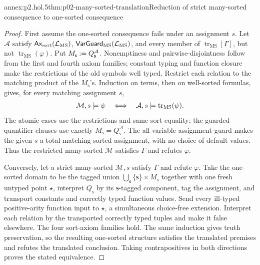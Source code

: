 \begin{annexitem}{annex:p2.hol.5}{thm:p02-many-sorted-translation}{Reduction of strict many-sorted consequence to one-sorted consequence}
\begin{proof}
First assume the one-sorted consequence fails under an assignment \(s\).  Let
\(\mathcal A\) satisfy \(\mathsf{Ax}_{\mathrm{sort}}(\mathcal{L}_{\mathrm{MS}})\),
\(\mathsf{VarGuard}_{\mathrm{MS}}(\mathcal{L}_{\mathrm{MS}})\), and every member of
\(\operatorname{tr}_{\mathrm{MS}}[\Gamma]\), but not
\(\operatorname{tr}_{\mathrm{MS}}(\varphi)\).  Put
\(M_{\mathsf s}\mathrel{:=} Q_{\mathsf s}^{\mathcal A}\).  Nonemptiness and pairwise-disjointness
follow from the first and fourth axiom families; constant typing and function
closure make the restrictions of the old symbols well typed.  Restrict each
relation to the matching product of the \(M_{\mathsf s}\)'s.  Induction on terms, then
on well-sorted formulas, gives, for every matching assignment \(s\),
\[
 \mathcal M,s\models\psi
 \quad\Longleftrightarrow\quad
 \mathcal A,s\models\operatorname{tr}_{\mathrm{MS}}(\psi).
\]
The atomic cases use the restrictions and same-sort equality; the guarded
quantifier clauses use exactly
\(M_{\mathsf s}=Q_{\mathsf s}^{\mathcal A}\).  The all-variable assignment
guard makes the given \(s\) a total matching sorted assignment, with no choice
of default values.  Thus the restricted many-sorted \(\mathcal M\) satisfies
\(\Gamma\) and refutes \(\varphi\).

Conversely, let a strict many-sorted \(\mathcal M,s\) satisfy \(\Gamma\) and
refute \(\varphi\).  Take the one-sorted domain to be the tagged union
\(\bigcup_{\mathsf s}\{\mathsf s\}\times M_{\mathsf s}\) together with one
fresh untyped point \(\star\), interpret
\(Q_{\mathsf s}\) by its \(\mathsf s\)-tagged
component, tag the assignment, and transport constants and correctly typed
function values.  Send every ill-typed positive-arity function input to
\(\star\), a simultaneous choice-free extension.
Interpret each relation by the transported correctly typed tuples and make it
false elsewhere.  The four sort-axiom families hold.  The same induction gives
truth preservation, so the resulting one-sorted structure satisfies the
translated premises and refutes the translated conclusion.  Taking
contrapositives in both directions proves the stated equivalence.
\end{proof}
\end{annexitem}

